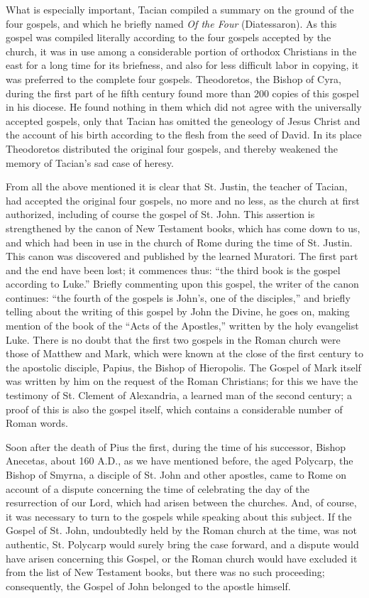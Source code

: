 What is especially important, Tacian compiled a summary on the ground of the four gospels, and which he briefly named \textit{Of the Four} (Diatessaron). As this gospel was compiled literally according to the four gospels accepted by the church, it was in use among a considerable portion of orthodox Christians in the east for a long time for its briefness, and also for less difficult labor in copying, it was preferred to the complete four gospels. Theodoretos, the Bishop of Cyra, during the first part of he fifth century found more than 200 copies of this gospel in his diocese. He found nothing in them which did not agree with the universally accepted gospels, only that Tacian has omitted the geneology of Jesus Christ and the account of his birth according to the flesh from the seed of David. In its place Theodoretos distributed the original four gospels, and thereby weakened the memory of Tacian's sad case of heresy.

From all the above mentioned it is clear that St. Justin, the teacher of Tacian, had accepted the original four gospels, no more and no less, as the church at first authorized, including of course the gospel of St. John. This assertion is strengthened by the canon of New Testament books, which has come down to us, and which had been in use in the church of Rome during the time of St. Justin. This canon was discovered and published by the learned Muratori. The first part and the end have been lost; it commences thus: ``the third book is the gospel according to Luke.'' Briefly commenting upon this gospel, the writer of the canon continues: ``the fourth of the gospels is John's, one of the disciples,'' and briefly telling about the writing of this gospel by John the Divine, he goes on, making mention of the book of the ``Acts of the Apostles,'' written by the holy evangelist Luke. There is no doubt that the first two gospels in the Roman church were those of Matthew and Mark, which were known at the close of the first century to the apostolic disciple, Papius, the Bishop of Hieropolis. The Gospel of Mark itself was written by him on the request of the Roman Christians; for this we have the testimony of St. Clement of Alexandria, a learned man of the second century; a proof of this is also the gospel itself, which contains a considerable number of Roman words.

Soon after the death of Pius the first, during the time of his successor, Bishop Anecetas, about 160 A.D., as we have mentioned before, the aged Polycarp, the Bishop of Smyrna, a disciple of St. John and other apostles, came to Rome on account of a dispute concerning the time of celebrating the day of the resurrection of our Lord, which had arisen between the churches. And, of course, it was necessary to turn to the gospels while speaking about this subject. If the Gospel of St. John, undoubtedly held by the Roman church at the time, was not authentic, St. Polycarp would surely bring the case forward, and a dispute would have arisen concerning this Gospel, or the Roman church would have excluded it from the list of New Testament books, but there was no such proceeding; consequently, the Gospel of John belonged to the apostle himself.

